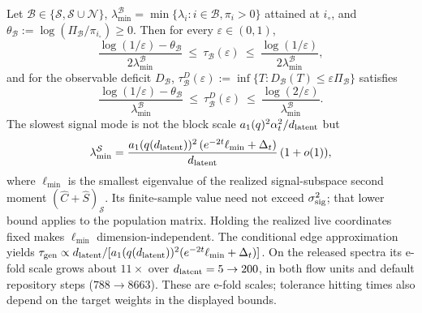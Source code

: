 \begin{proposition}\label{prop:taugen-p1}
Let $\mathcal B\in\{\mathcal S,\mathcal S\cup\mathcal N\}$, $\lambda^{\mathcal B}_{\min}=\min\{\lambda_i:i\in\mathcal B,\pi_i>0\}$ attained at $i_\circ$, and $\theta_{\mathcal B}:=\log(\Pi_{\mathcal B}/\pi_{i_\circ})\ge0$. Then for every $\varepsilon\in(0,1)$,
\begin{equation}\label{eq:taugen-bounds-p1}
\frac{\log(1/\varepsilon)-\theta_{\mathcal B}}{2\lambda^{\mathcal B}_{\min}}\ \le\ \tau_{\mathcal B}(\varepsilon)\ \le\ \frac{\log(1/\varepsilon)}{2\lambda^{\mathcal B}_{\min}},
\end{equation}
and for the observable deficit $D_{\mathcal B}$, $\tau^D_{\mathcal B}(\varepsilon):=\inf\{T:D_{\mathcal B}(T)\le\varepsilon\Pi_{\mathcal B}\}$ satisfies
\[
\frac{\log(1/\varepsilon)-\theta_{\mathcal B}}{\lambda^{\mathcal B}_{\min}}\ \le\ \tau^D_{\mathcal B}(\varepsilon)\ \le\ \frac{\log(2/\varepsilon)}{\lambda^{\mathcal B}_{\min}} .
\]
The slowest signal mode is not the block scale $a_1(q)^2\alpha_t^2/d_{\mathrm{latent}}$ but
\begin{equation}\label{eq:lammin-signal-p1}
\lambda^{\mathcal S}_{\min}=\frac{a_1(q(d_{\mathrm{latent}}))^2\,(e^{-2t}\ell_{\min}+\Delta_t)}{d_{\mathrm{latent}}}\,(1+o(1)),
\end{equation}
where $\ell_{\min}$ is the smallest eigenvalue of the realized signal-subspace second moment $(\hat C+\hat S)_{\mathcal S}$. Its finite-sample value need not exceed $\sigma_{\mathrm{sig}}^2$; that lower bound applies to the population matrix. Holding the realized live coordinates fixed makes $\ell_{\min}$ dimension-independent. The conditional edge approximation yields $\tau_{\mathrm{gen}}\propto d_{\mathrm{latent}}/[a_1(q(d_{\mathrm{latent}}))^2(e^{-2t}\ell_{\min}+\Delta_t)]$. On the released spectra its e-fold scale grows about $11\times$ over $d_{\mathrm{latent}}=5\to200$, in both flow units and default repository steps ($788\to8663$). These are e-fold scales; tolerance hitting times also depend on the target weights in the displayed bounds.

\end{proposition}
